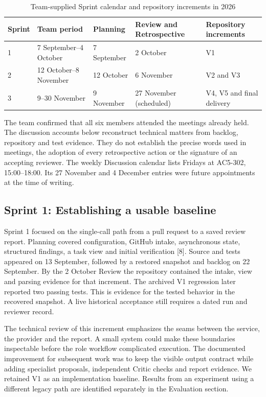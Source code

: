 \documentclass[journal,compsoc]{IEEEtran}
\begin{document}
\begin{table}[t]
\caption{Team-supplied Sprint calendar and repository increments in 2026}
\centering
\begin{tabular}{lllll}
\toprule
Sprint & Team period & Planning & Review and Retrospective & Repository increments \\ \midrule
1 & 7 September--4 October & 7 September & 2 October & V1 \\
2 & 12 October--8 November & 12 October & 6 November & V2 and V3 \\
3 & 9--30 November & 9 November & 27 November (scheduled) & V4, V5 and final delivery \\ \bottomrule
\end{tabular}
\end{table}

The team confirmed that all six members attended the meetings already held. The discussion accounts below reconstruct technical matters from backlog, repository and test evidence. They do not establish the precise words used in meetings, the adoption of every retrospective action or the signature of an accepting reviewer. The weekly Discussion calendar lists Fridays at AC5-302, 15:00--18:00. Its 27 November and 4 December entries were future appointments at the time of writing.

\subsection{Sprint 1: Establishing a usable baseline}
Sprint 1 focused on the single-call path from a pull request to a saved review report. Planning covered configuration, GitHub intake, asynchronous state, structured findings, a task view and initial verification [8]. Source and tests appeared on 13 September, followed by a restored snapshot and backlog on 22 September. By the 2 October Review the repository contained the intake, view and parsing evidence for that increment. The archived V1 regression later reported two passing tests. This is evidence for the tested behavior in the recovered snapshot. A live historical acceptance still requires a dated run and reviewer record.

The technical review of this increment emphasizes the seams between the service, the provider and the report. A small system could make these boundaries inspectable before the role workflow complicated execution. The documented improvement for subsequent work was to keep the visible output contract while adding specialist proposals, independent Critic checks and report evidence. We retained V1 as an implementation baseline. Results from an experiment using a different legacy path are identified separately in the Evaluation section.
\end{document}

